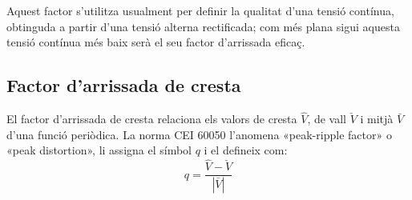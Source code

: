 Aquest factor s'utilitza usualment per definir la qualitat d'una
tensió contínua, obtinguda a partir  d'una tensió alterna rectificada; com més
plana sigui aquesta tensió contínua més baix serà el seu factor
d'arrissada eficaç.

\subsection{Factor d'arrissada de cresta}

El factor d'arrissada de cresta relaciona els valors de cresta $\hat{V}$, de vall $\check{V}$  i mitjà $\bar{V}$
 d'una funció periòdica. La norma CEI 60050 l'anomena «peak-ripple factor» o «peak distortion», li assigna el símbol $q$ i el defineix com:
\begin{equation}
    q = \frac{\hat{V} - \check{V}}{|\bar{V}|}
\end{equation}

